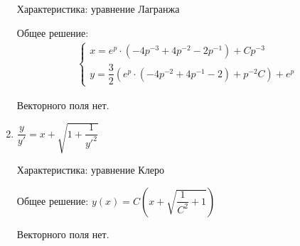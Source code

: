 \documentclass[14pt, a4paper]{extarticle}
\begin{document}
\begin{enumerate}
				Характеристика: уравнение Лагранжа
			
				Общее решение:
					\begin{align*}
						\begin{cases}
							 x = e^p \cdot \left(-4p^{-3}+4p^{-2}-2p^{-1}\right) + Cp^{-3}\\
							 y = \dfrac{3}{2} \left(e^p \cdot \left(-4p^{-2}+4p^{-1}-2\right)+p^{-2}C\right) + e^p
						\end{cases}
					\end{align*}
			
				Векторного поля нет.
				
			\item \(\dfrac{y}{y'} = x + \sqrt{1 + \dfrac{1}{y'^2}}\)

				Характеристика: уравнение Клеро
			
				Общее решение: \(y(x) = C \left(x + \sqrt{\dfrac{1}{C^2} + 1}\right)\)
			
				Векторного поля нет.
		\end{enumerate}
		\pagebreak
		
\end{document}
